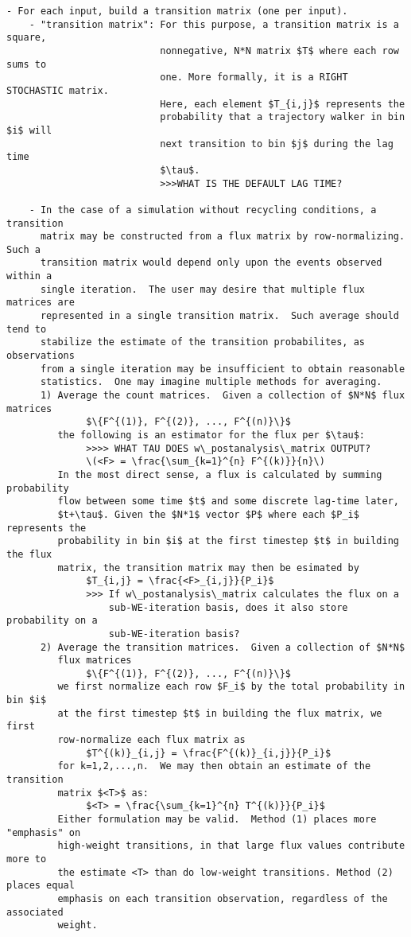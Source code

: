 \documentclass[10pt]{article}
\begin{document}
\begin{Verbatim}[commandchars=\\\{\},codes={\catcode`$=3\catcode`^=7\catcode`_=8}]
  - For each input, build a transition matrix (one per input).
    - "transition matrix": For this purpose, a transition matrix is a square,
                           nonnegative, N*N matrix $T$ where each row sums to 
                           one. More formally, it is a RIGHT STOCHASTIC matrix.  
                           Here, each element $T_{i,j}$ represents the 
                           probability that a trajectory walker in bin $i$ will
                           next transition to bin $j$ during the lag time 
                           $\tau$. 
                           >>>WHAT IS THE DEFAULT LAG TIME?

    - In the case of a simulation without recycling conditions, a transition
      matrix may be constructed from a flux matrix by row-normalizing. Such a
      transition matrix would depend only upon the events observed within a 
      single iteration.  The user may desire that multiple flux matrices are 
      represented in a single transition matrix.  Such average should tend to
      stabilize the estimate of the transition probabilites, as observations 
      from a single iteration may be insufficient to obtain reasonable
      statistics.  One may imagine multiple methods for averaging.
      1) Average the count matrices.  Given a collection of $N*N$ flux matrices
              $\{F^{(1)}, F^{(2)}, ..., F^{(n)}\}$
         the following is an estimator for the flux per $\tau$:
              >>>> WHAT TAU DOES w\_postanalysis\_matrix OUTPUT?
              \(<F> = \frac{\sum_{k=1}^{n} F^{(k)}}{n}\)
         In the most direct sense, a flux is calculated by summing probability 
         flow between some time $t$ and some discrete lag-time later, 
         $t+\tau$. Given the $N*1$ vector $P$ where each $P_i$ represents the 
         probability in bin $i$ at the first timestep $t$ in building the flux 
         matrix, the transition matrix may then be esimated by 
              $T_{i,j} = \frac{<F>_{i,j}}{P_i}$
              >>> If w\_postanalysis\_matrix calculates the flux on a 
                  sub-WE-iteration basis, does it also store probability on a 
                  sub-WE-iteration basis? 
      2) Average the transition matrices.  Given a collection of $N*N$ 
         flux matrices 
              $\{F^{(1)}, F^{(2)}, ..., F^{(n)}\}$
         we first normalize each row $F_i$ by the total probability in bin $i$
         at the first timestep $t$ in building the flux matrix, we first 
         row-normalize each flux matrix as 
              $T^{(k)}_{i,j} = \frac{F^{(k)}_{i,j}}{P_i}$
         for k=1,2,...,n.  We may then obtain an estimate of the transition
         matrix $<T>$ as:
              $<T> = \frac{\sum_{k=1}^{n} T^{(k)}}{P_i}$
         Either formulation may be valid.  Method (1) places more "emphasis" on 
         high-weight transitions, in that large flux values contribute more to 
         the estimate <T> than do low-weight transitions. Method (2) places equal
         emphasis on each transition observation, regardless of the associated
         weight.


\end{Verbatim}
\end{document}
